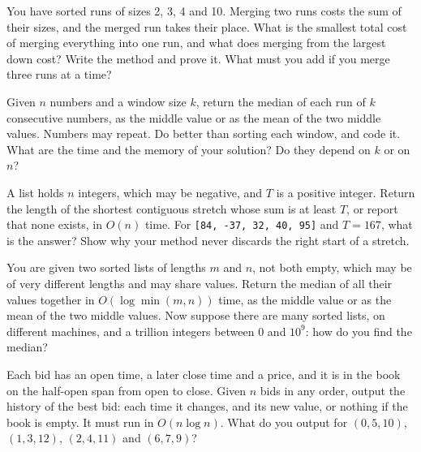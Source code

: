 \begin{question}\label{iq:iv3:algorithms:68}
You have sorted runs of sizes 2, 3, 4 and 10. Merging two runs costs the sum of their sizes, and the merged run takes their place. What is the smallest total cost of merging everything into one run, and what does merging from the largest down cost? Write the method and prove it. What must you add if you merge three runs at a time?
\end{question}

\begin{question}\label{iq:iv3:algorithms:69}
Given $n$ numbers and a window size $k$, return the median of each run of $k$ consecutive numbers, as the middle value or as the mean of the two middle values. Numbers may repeat. Do better than sorting each window, and code it. What are the time and the memory of your solution? Do they depend on $k$ or on $n$?
\end{question}

\begin{question}\label{iq:iv3:algorithms:70}
A list holds $n$ integers, which may be negative, and $T$ is a positive integer. Return the length of the shortest contiguous stretch whose sum is at least $T$, or report that none exists, in $O(n)$ time. For \texttt{[84, -37, 32, 40, 95]} and $T = 167$, what is the answer? Show why your method never discards the right start of a stretch.
\end{question}

\begin{question}\label{iq:iv3:algorithms:71}
You are given two sorted lists of lengths $m$ and $n$, not both empty, which may be of very different lengths and may share values. Return the median of all their values together in $O(\log \min(m, n))$ time, as the middle value or as the mean of the two middle values. Now suppose there are many sorted lists, on different machines, and a trillion integers between 0 and $10^9$: how do you find the median?
\end{question}

\begin{question}\label{iq:iv3:algorithms:72}
Each bid has an open time, a later close time and a price, and it is in the book on the half-open span from open to close. Given $n$ bids in any order, output the history of the best bid: each time it changes, and its new value, or nothing if the book is empty. It must run in $O(n \log n)$. What do you output for $(0, 5, 10)$, $(1, 3, 12)$, $(2, 4, 11)$ and $(6, 7, 9)$?
\end{question}

